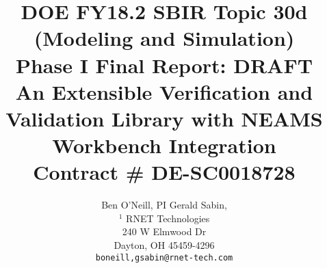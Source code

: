 \title{DOE FY18.2 SBIR Topic 30d (Modeling and Simulation)\\
\vspace{0.25in}Phase I Final Report: DRAFT\\
\vspace{0.1in}An Extensible Verification and Validation Library with NEAMS Workbench Integration\\
\vspace{0.1in}Contract \# DE-SC0018728
\vspace{0.5in}}
\author{Ben O'Neill, PI \hspace{0.75in} Gerald Sabin, 
  \\$^1$ RNET Technologies\\
  240 W Elmwood Dr\\
  Dayton, OH 45459-4296\\
  {\tt {boneill,gsabin}@rnet-tech.com}\\\\
}
